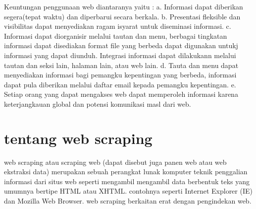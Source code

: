 \documentclass[12pt, a4paper]{article}
\begin{document}
Keuntungan penggunaan web diantaranya yaitu :
a. Informasi dapat diberikan segera(tepat waktu) dan diperbarui secara berkala.
b. Presentasi fleksible dan visibilitas dapat menyediakan ragam isyarat untuk diseminasi informasi.
c. Informasi dapat diorganisir melalui tautan dan menu, berbagai tingkatan informasi dapat disediakan format file yang berbeda dapat digunakan untukj informasi yang dapat diunduh. Integrasi informasi dapat dilakukann melalui tautan dan seksi lain, halaman lain, atau web lain.
d. Tauta  dan menu dapat menyediakan informasi bagi pemangku kepentingan yang berbeda, informasi dapat pula diberikan melalui daftar email kepada pemangku kepentingan.
e. Setiap orang yang dapat mengakses web dapat memperoleh informasi karena keterjangkauan global dan potensi komunikasi masl dari web.
	   
\section{tentang web scraping}
web scraping atau scraping web (dapat disebut juga panen web atau web ekstraksi data) merupakan sebuah perangkat lunak komputer teknik penggalian informasi dari situs web seperti mengambil mengambil data berbentuk teks yang umumnya bertipe HTML atau XHTML. contohnya seperti Internet Explorer (IE) dan Mozilla Web Browser. web scraping berkaitan erat dengan pengindekan web.
	   
\end{document}
